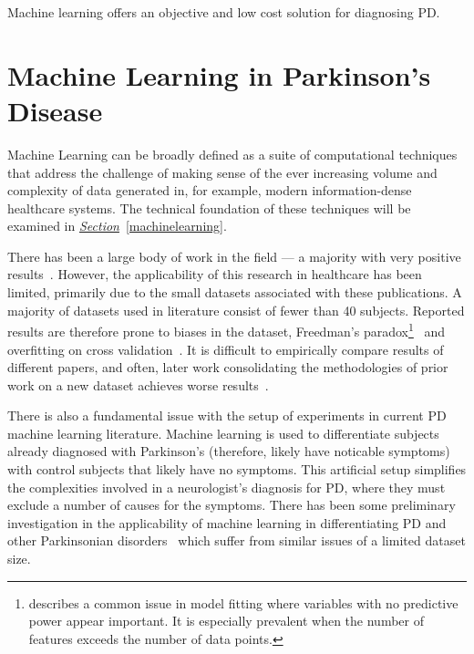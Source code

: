 \documentclass[12pt, twoside]{book}
\renewcommand\emph[1]{\textit{\color{USred}{#1}}}
\begin{document}
\begin{highlight}
Machine learning offers an objective and low cost solution for diagnosing PD.
\end{highlight}

\section{Machine Learning in Parkinson's Disease}
\label{mlpd}
Machine Learning can be broadly defined as a suite of computational techniques that address the challenge of making sense of the ever increasing volume and complexity of data generated in, for example, modern information-dense healthcare systems. The technical foundation of these techniques will be examined in \textit{\hyperref[machinelearning]{Section}}~\ref{machinelearning}.

There has been a large body of work in the field --- a majority with very positive results~\cite{tsanas2012novel, arora2014high}. However, the applicability of this research in healthcare has been limited, primarily due to the small datasets associated with these publications. A majority of datasets used in literature consist of fewer than 40 subjects. Reported results are therefore prone to biases in the dataset, Freedman's paradox\footnote{\emph{Freedman's paradox} describes a common issue in model fitting where variables with no predictive power appear important. It is especially prevalent when the number of features exceeds the number of data points.}~\cite{freedmanparadox} and overfitting on cross validation~\cite{overfittingcv}. It is difficult to empirically compare results of different papers, and often, later work consolidating the methodologies of prior work on a new dataset achieves worse results~\cite{zhan2016high}.



There is also a fundamental issue with the setup of experiments in current PD machine learning literature. Machine learning is used to differentiate subjects already diagnosed with Parkinson's (therefore, likely have noticable symptoms) with control subjects that likely have no symptoms. This artificial setup simplifies the complexities involved in a neurologist's diagnosis for PD, where they must exclude a number of causes for the symptoms. There has been some preliminary investigation in the applicability of machine learning in differentiating PD and other Parkinsonian disorders~\cite{esser2011assessment, PDessentialtremordifferentiation} which suffer from similar issues of a limited dataset size.
\end{document}
